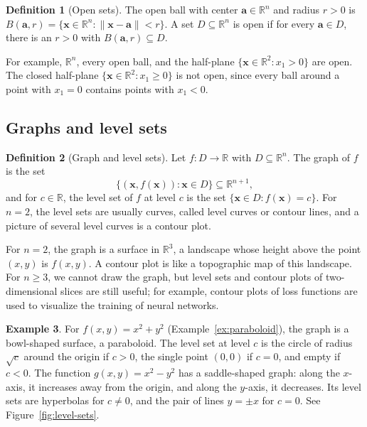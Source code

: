 \documentclass[11pt]{article}
\newcommand{\norm}[1]{\lVert #1 \rVert}
\theoremstyle{definition}
\newtheorem{definition}{Definition}[section]
\newtheorem{example}[definition]{Example}
\theoremstyle{plain}
\theoremstyle{remark}
\begin{document}
\begin{definition}[Open sets]\label{def:open}
    The open ball with center $\mathbf{a} \in \mathbb{R}^n$ and radius $r > 0$ is $B(\mathbf{a}, r) = \{\mathbf{x} \in \mathbb{R}^n : \norm{\mathbf{x} - \mathbf{a}} < r\}$. A set $D \subseteq \mathbb{R}^n$ is open if for every $\mathbf{a} \in D$, there is an $r > 0$ with $B(\mathbf{a}, r) \subseteq D$.
\end{definition}

For example, $\mathbb{R}^n$, every open ball, and the half-plane $\{\mathbf{x} \in \mathbb{R}^2 : x_1 > 0\}$ are open. The closed half-plane $\{\mathbf{x} \in \mathbb{R}^2 : x_1 \geq 0\}$ is not open, since every ball around a point with $x_1 = 0$ contains points with $x_1 < 0$.

\subsection{Graphs and level sets}

\begin{definition}[Graph and level sets]\label{def:level-sets}
    Let $f: D \to \mathbb{R}$ with $D \subseteq \mathbb{R}^n$. The graph of $f$ is the set
    \[\{(\mathbf{x}, f(\mathbf{x})) : \mathbf{x} \in D\} \subseteq \mathbb{R}^{n+1},\]
    and for $c \in \mathbb{R}$, the level set of $f$ at level $c$ is the set $\{\mathbf{x} \in D : f(\mathbf{x}) = c\}$. For $n = 2$, the level sets are usually curves, called level curves or contour lines, and a picture of several level curves is a contour plot.
\end{definition}

For $n = 2$, the graph is a surface in $\mathbb{R}^3$, a landscape whose height above the point $(x, y)$ is $f(x, y)$. A contour plot is like a topographic map of this landscape. For $n \geq 3$, we cannot draw the graph, but level sets and contour plots of two-dimensional slices are still useful; for example, contour plots of loss functions are used to visualize the training of neural networks.

\begin{example}\label{ex:level-sets}
    For $f(x, y) = x^2 + y^2$ (Example~\ref{ex:paraboloid}), the graph is a bowl-shaped surface, a paraboloid. The level set at level $c$ is the circle of radius $\sqrt{c}$ around the origin if $c > 0$, the single point $(0, 0)$ if $c = 0$, and empty if $c < 0$. The function $g(x, y) = x^2 - y^2$ has a saddle-shaped graph: along the $x$-axis, it increases away from the origin, and along the $y$-axis, it decreases. Its level sets are hyperbolas for $c \neq 0$, and the pair of lines $y = \pm x$ for $c = 0$. See Figure~\ref{fig:level-sets}.
\end{example}
\end{document}
